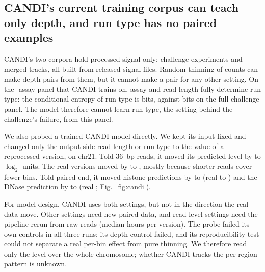 \documentclass[pdflatex,sn-mathphys-num]{sn-jnl}
\newcommand{\lit}[1]{#1}
\begin{document}
\subsection{CANDI's current training corpus can teach only depth, and run type has no paired examples}\label{sec:r12}

CANDI's two corpora hold processed signal only: \corpEic{} challenge experiments and
\corpMerged{} merged tracks, all built from released signal files. Random thinning of counts can
make depth pairs from them, but it cannot make a pair for any other setting. On the \nPanelAssays{}-assay
panel that CANDI trains on, assay and read length fully determine run type: the conditional
entropy of run type is \bitsPanel{} bits, against \bitsFull{} bits on the full challenge panel.
The model therefore cannot learn run type, the setting behind the challenge's failure, from
this panel.

We also probed a trained CANDI model directly. We kept its input fixed and changed only the
output-side read length or run type to the value of a reprocessed version, on \lit{chr21}. Told
\lit{36}~bp reads, it moved its predicted level by \swLPredLo{} to \swLPredHi{} $\log_{\lit{2}}$
units. The real versions moved by \swLRealLo{} to \swLRealHi{}, mostly because shorter reads
cover fewer bins. Told paired-end, it moved histone predictions by \swPPredLo{} to \swPPredHi{}
(real \swPRealLo{} to \swPRealHi{}) and the DNase prediction by \swDPredLo{} to \swDPredHi{} (real
\swDRealLo{}; Fig.~\ref{fig:candi}).

For model design, CANDI uses both settings, but not in the direction the real data move. Other
settings need new paired data, and read-level settings need the pipeline rerun from raw reads
(median \costFastq{} hours per version). The probe failed its own controls in all three runs:
its depth control failed, and its reproducibility test could not separate a real per-bin
effect from pure thinning. We therefore read only the level over the whole chromosome; whether
CANDI tracks the per-region pattern is unknown.
\end{document}
